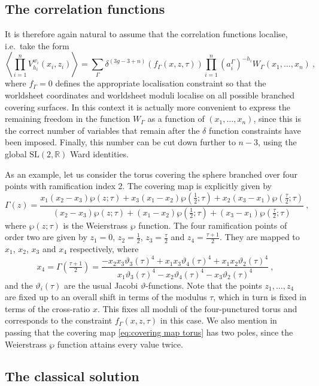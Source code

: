 \documentclass[12pt,a4paper]{article}
\newcommand{\be}{\begin{equation}}
\newcommand{\ee}{\end{equation}}
\begin{document}
\subsection{The correlation functions}
It is therefore again natural to assume that the correlation functions localise, i.e.~take the form
\be \label{eq:highergenuscov}
\left\langle \prod_{i=1}^n V_{h_i}^{w_i}(x_i,z_i)  \right\rangle= \sum_\Gamma\delta^{(3g-3+n)}(f_\Gamma(x,z,\tau)) \prod_{i=1}^n (a_i^\Gamma)^{-h_i} W_\Gamma(x_1,\dots, x_n)\ ,
\ee
where $f_\Gamma=0$ defines the appropriate localisation constraint so that the worldsheet coordinates and worldsheet moduli localise on all possible branched covering surfaces. In this context it is actually more convenient to express the remaining freedom in the function $W_\Gamma$ as a function of $(x_1,\dots,x_n)$, since this is the correct number of variables that remain after the $\delta$ function constraints have been imposed. Finally, this number can be cut down further  to $n-3$, using the global $\mathrm{SL}(2,\mathds{R})$ Ward identities.

As an example, let us consider the torus covering the sphere branched over four points with ramification index 2. The covering map is explicitly given by
\be 
\Gamma(z)=\frac{x_1(x_2-x_3)\wp(z;\tau)+x_3(x_1-x_2)\wp(\frac{1}{2};\tau)+x_2(x_3-x_1)\wp (\frac{\tau}{2};\tau)}{(x_2-x_3)\wp(z;\tau)+(x_1-x_2)\wp(\frac{1}{2};\tau)+(x_3-x_1)\wp (\frac{\tau}{2};\tau)}\ , \label{eq:covering map torus}
\ee
where $\wp(z;\tau)$ is the Weierstrass $\wp$ function. The four ramification points of order two are  given by $z_1=0$, $z_2=\tfrac{1}{2}$, $z_3=\tfrac{\tau}{2}$ and $z_4=\tfrac{\tau+1}{2}$. They are mapped to $x_1$, $x_2$, $x_3$ and $x_4$ respectively, where
\be 
x_4=\Gamma(\tfrac{\tau+1}{2})=\frac{-x_2 x_3 \vartheta_3(\tau)^4+x_1x_3 \vartheta_4(\tau)^4+x_1x_2 \vartheta_2(\tau)^4}{x_1 \vartheta_3(\tau)^4-x_2 \vartheta_4(\tau)^4-x_3 \vartheta_2(\tau)^4}\ ,
\ee
and the $\vartheta_i(\tau)$ are the usual Jacobi $\vartheta$-functions. Note that the points $z_1, \dots,z_4$ are fixed up to an overall shift in terms of the modulus $\tau$, which in turn is fixed in terms of the cross-ratio $x$. This fixes all moduli of the four-punctured torus and corresponds to the constraint $f_\Gamma(x,z,\tau)$ in this case. We also mention in passing that the covering map \eqref{eq:covering map torus} has two poles, since the Weierstrass $\wp$ function attains every value twice.

\subsection{The classical solution}
\end{document}
